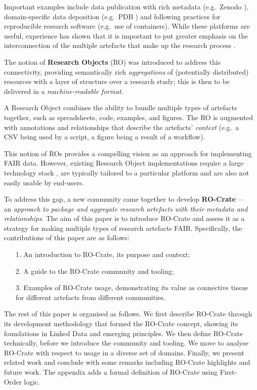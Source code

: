 Important examples include data publication with rich metadata
(e.g.~Zenodo \cite{Dillen 2019}),
domain-specific data deposition (e.g.~PDB
\cite{Berman 2007}) and following
practices for reproducible research software
\cite{ch5-101} (e.g.~use
of containers). While these platforms are useful, experience has shown
that it is important to put greater emphasis on the interconnection of
the multiple artefacts that make up the research process
\cite{ch5-71}.

The notion of \textbf{Research Objects}
\cite{Bechhofer 2013}
(RO) was introduced to address this connectivity, providing semantically
rich \emph{aggregations} of (potentially distributed) resources with a
layer of structure over a research study; this is then to be delivered
in a \emph{machine-readable format}.

A Research Object combines the ability to bundle multiple types of
artefacts together, such as spreadsheets, code, examples, and figures.
The RO is augmented with annotations and relationships that describe the
artefacts' \emph{context} (e.g.~a CSV being used by a script, a figure
being a result of a workflow).

This notion of ROs provides a compelling vision as an approach for
implementing FAIR data. However, existing Research Object
implementations require a large technology stack
\cite{Belhajjame 2015}, are
typically tailored to a particular platform and are also not easily
usable by end-users.

To address this gap, a new community came together
\cite{OCarragain 2019} to develop
\textbf{RO-Crate} --- an \emph{approach to package and aggregate
research artefacts with their metadata and relationships}. The aim of
this paper is to introduce RO-Crate and assess it as a strategy for
making multiple types of research artefacts FAIR. Specifically, the
contributions of this paper are as follows:

\begin{enumerate}
  \item[1.] An introduction to RO-Crate, its purpose and context;
  \item[2.] A guide to the RO-Crate community and tooling;
  \item[3.] Examples of RO-Crate usage, demonstrating its value as connective tissue for different artefacts from different communities.
\end{enumerate}

The rest of this paper is organised as follows. We first describe
RO-Crate through its development methodology that formed the RO-Crate
concept, showing its foundations in Linked Data and emerging principles.
We then define RO-Crate technically, before we introduce the community
and tooling. We move to analyse RO-Crate with respect to usage in a
diverse set of domains. Finally, we present related work and conclude
with some remarks including RO-Crate highlights and future work. The
appendix adds a formal definition of RO-Crate using First-Order logic.


